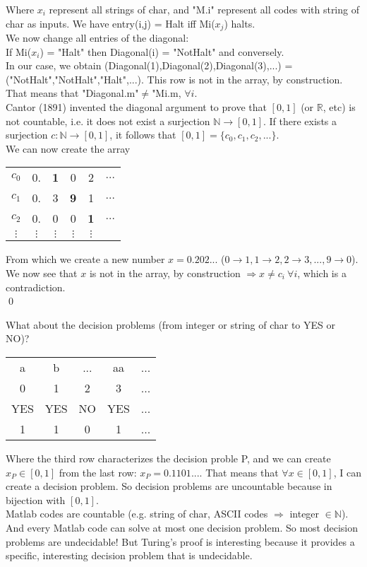 \documentclass[paper=a4, fontsize=11pt]{scrartcl}
\numberwithin{equation}{section} %
\numberwithin{figure}{section} %
\numberwithin{table}{section} %
\begin{document}
Where $x_i$ represent all strings of char, and "M.i" represent all codes with string of char as inputs. We have entry(i,j) = Halt iff Mi($x_j$) halts.\\

We now change all entries of the diagonal:\\
If Mi($x_i$) = "Halt" then Diagonal(i) = "NotHalt" and conversely.\\

In our case, we obtain (Diagonal(1),Diagonal(2),Diagonal(3),...) = ("NotHalt","NotHalt","Halt",...). This row is not in the array, by construction. That means that "Diagonal.m"$\neq$"Mi.m, $\forall i$.\\

Cantor (1891) invented the diagonal argument to prove that $[0,1]$ (or $\mathbb{R}$, etc) is not countable, i.e. it does not exist a surjection $\mathbb{N}\rightarrow [0,1]$. If there exists a surjection $c:\mathbb{N}\rightarrow [0,1]$, it follows that $[0,1] = \{ c_0,c_1,c_2,...\}$.\\

We can now create the array
\begin{tabular}{c|ccccc}
	\hline
 	$c_0$ & 0. & \textbf{1} & 0 & 2 & $\hdots$  \\
 	$c_1$ & 0. & 3 & \textbf{9} & 1 & $\hdots$  \\
 	$c_2$ & 0. & 0 & 0 & \textbf{1}& $\hdots$  \\
 	$\vdots$ & $\vdots$ & $\vdots$ & $\vdots$ & $\vdots$ &  \\
\end{tabular}

From which we create a new number $x=0.202...$ ($0\rightarrow 1, 1\rightarrow 2, 2\rightarrow 3, ..., 9\rightarrow 0$). We now see that $x$ is not in the array, by construction $\Rightarrow x \neq c_i ~ \forall i$, which is a contradiction.\\ \qed

What about the decision problems (from integer or string of char to YES or NO)?

\begin{center}
\begin{tabular}{ccccc}
	a & b & ... & aa & ...\\
	0 & 1 & 2 & 3 & ... \\
	\hline
	YES & YES & NO & YES & ...\\
	\hline
	1 & 1 & 0 & 1 & ...\\
	\hline
\end{tabular}
\end{center}

Where the third row characterizes the decision proble P, and we can create $x_P \in [0,1]$ from the last row: $x_P = 0.1101...$. That means that $\forall x \in [0,1]$, I can create a decision problem. So decision problems are uncountable because in bijection with $[0,1]$.\\

Matlab codes are countable (e.g. string of char, ASCII codes $\Rightarrow$ integer $\in \mathbb{N}$). And every Matlab code can solve at most one decision problem. So most decision problems are undecidable! But Turing's proof is interesting because it provides a specific, interesting decision problem that is undecidable.
\end{document}
